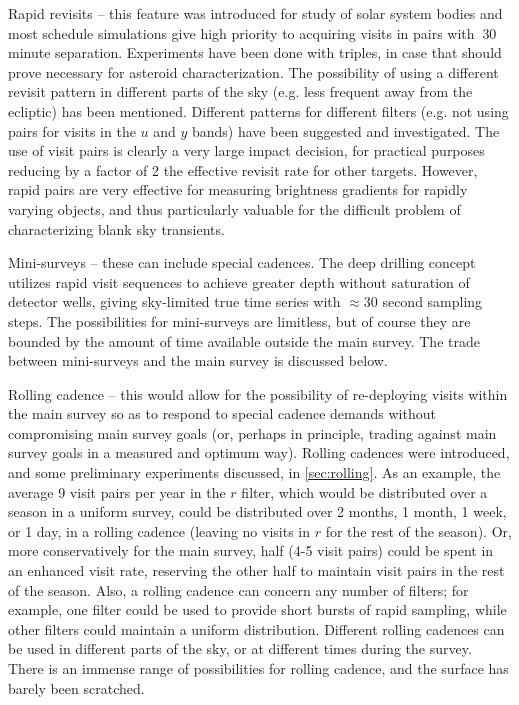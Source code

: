\begin{description}

\item{Rapid revisits} -- this feature was introduced for study of solar
system bodies and most schedule simulations give high priority to
acquiring visits in pairs with $~$30 minute separation.  Experiments
have been done with triples, in case that should prove necessary for
asteroid characterization.  The possibility of using a different revisit
pattern in different parts of the sky (e.g. less frequent away from the
ecliptic) has been mentioned.  Different patterns for different filters
(e.g. not using pairs for visits in the $u$ and $y$ bands) have been
suggested and investigated. The use of visit pairs is clearly a very
large impact decision, for practical purposes reducing by a factor of 2
the effective revisit rate for other targets. However, rapid pairs are
very effective for measuring brightness gradients for rapidly varying
objects, and thus particularly valuable for the difficult problem of
characterizing blank sky transients.

\item{Mini-surveys} --  these can include special cadences. The deep
drilling concept utilizes rapid visit sequences to achieve greater depth
without saturation of detector wells, giving sky-limited true time
series with $\approx$30 second sampling steps.  The possibilities for
mini-surveys are limitless, but of course they are bounded by the amount
of time available outside the main survey. The trade between
mini-surveys and the main survey is discussed below.

\item{Rolling cadence} -- this would allow for the possibility of
re-deploying visits within the main survey so as to respond to special
cadence demands without compromising main survey goals (or, perhaps in
principle, trading against main survey goals in a measured and optimum
way). Rolling cadences were introduced, and some preliminary experiments discussed, in \autoref{sec:rolling}.  As an example, the
average 9 visit pairs per year in the $r$ filter, which would be
distributed over a season in a uniform survey, could be distributed over
2 months, 1 month, 1 week, or 1 day, in a rolling cadence (leaving no
visits in $r$ for the rest of the season).  Or, more conservatively for
the main survey, half (4-5 visit pairs) could be spent in an enhanced
visit rate, reserving the other half to maintain visit pairs in the rest
of the season.  Also, a rolling cadence can concern any number of
filters; for example, one filter could be used to provide short bursts
of rapid sampling, while other filters could maintain a uniform
distribution.  Different rolling cadences can be used in different parts
of the sky, or at different times during the survey.  There is an
immense range of possibilities for rolling cadence, and the surface has
barely been scratched.


\end{description}
